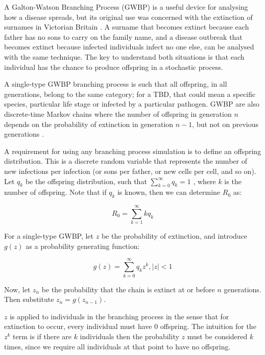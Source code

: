 \documentclass[hidelinks]{article}
\begin{document}
A Galton-Watson Branching Process (GWBP) is a useful device for analysing how a disease spreads, but its original use was concerned with the extinction of surnames in Victorian Britain \citep{Athreya1972}. A surname that becomes extinct because each father has no sons to carry on the family name, and a disease outbreak that becomes extinct because infected individuals infect no one else, can be analysed with the same technique. The key to understand both situations is that each individual has the chance to produce offspring in a stochastic process.

A single-type GWBP branching process is such that all offspring, in all generations, belong to the same category; for a TBD, that could mean a specific species, particular life stage or infected by a particular pathogen. GWBP are also discrete-time Markov chains where the number of offspring in generation $ n $ depends on the probability of extinction in generation $ n - 1 $, but not on previous generations \citep{Allen2019}.

A requirement for using any branching process simulation is to define an offspring distribution. This is a discrete random variable that represents the number of new infections per infection (or sons per father, or new cells per cell, and so on). Let $ q_k $ be the offspring distribution, such that $ \sum_{k=0}^\infty q_k = 1 $ \citep{Diekman2000}, where $ k $ is the number of offspring.  Note that if $ q_k $ is known, then we can determine $ R_0 $ as:

\begin{equation}\label{offspringR0}
	R_0 = \sum_{k=1}^\infty k q_k
\end{equation}

For a single-type GWBP, let $ z $ be the probability of extinction, and introduce $ g(z) $ as a probability generating function:

\begin{equation}\label{BranchingProcessPGF}
    g(z) = \sum_{k=0}^\infty q_k z^k, |z| < 1
\end{equation}

Now, let $ z_n $ be the probability that the chain is extinct at or before $ n $ generations. Then substitute $ z_n = g(z_{n-1})$.

$ z $ is applied to individuals in the branching process in the sense that for extinction to occur, every individual must have $ 0 $ offspring. The intuition for the $ z^k $ term is if there are $ k $ individuals then the probability $ z $ must be considered $ k $ times, since we require all individuals at that point to have no offspring.
\end{document}
